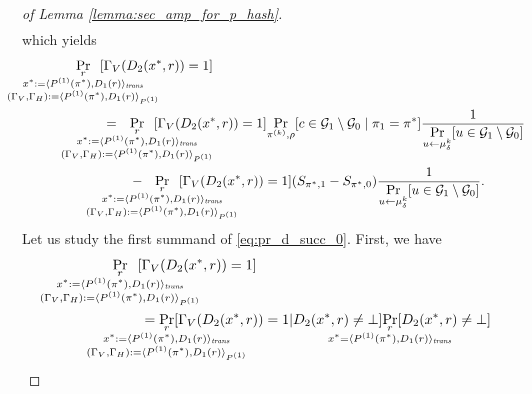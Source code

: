 \begin{proof}[of Lemma \ref{lemma:sec_amp_for_p_hash}]
\begin{align*}
\end{align*}
%
which yields
\begin{align}
\label{eq:pr_d_succ_0}
&\IndII\underset{
  \mathclap{
    \substack{r \\ x^* := \langle P^{(1)}(\pi^*), D_1(r) \rangle_{\mathit{trans}} \\ (\Gamma_V, \Gamma_H) := \langle P^{(1)}(\pi^*), D_1(r) \rangle_{P^{(1)}} }}}
{\Pr}\mkern13mu[\Gamma_V(D_2(x^*, r)) = 1] \notag\\
%
&\IndIII = \mkern13mu
  \underset{
    \mathclap{
      \substack{r \\ x^* := \langle P^{(1)}(\pi^*), D_1 (r) \rangle_{\mathit{trans}} \\ (\Gamma_V, \Gamma_H) := \langle P^{(1)}(\pi^*), D_1 (r) \rangle_{P^{(1)}} }}}
  {\Pr}\mkern13mu[\Gamma_V(D_2(x^*, r)) = 1]
  \underset{\pi^{(k)},\rho}{\Pr}[c \in \cG_1 \setminus \cG_0 \mid \pi_1 = \pi^*]
\frac{1}{\underset{u \leftarrow \mu_{\delta}^k}{\Pr}[ u \in \cG_1 \setminus \cG_0]}\notag\\
%
&\IndIIII - \mkern13mu
\underset{
  \mathclap{
  \substack{r \\ x^* := \langle P^{(1)}(\pi^*), D_1(r) \rangle_{\mathit{trans}} \\ (\Gamma_V, \Gamma_H) := \langle P^{(1)}(\pi^*), D_1(r) \rangle_{P^{(1)}} }}}
{\Pr}\mkern13mu[\Gamma_V(D_2(x^*, r)) = 1](S_{\pi^*,1} - S_{\pi^*,0})
\frac{1}{\underset{u \leftarrow \mu_{\delta}^k}{\Pr}[ u \in \cG_1 \setminus\cG_0]}.
\end{align}
Let us study the first summand of \eqref{eq:pr_d_succ_0}. First, we have
\begin{align}
  \label{eq:pr_gamma_v_0}
  \IndII &\underset{
    \mathclap{
      \substack{r \\
        x^* := \langle P^{(1)}(\pi^*), D_1 (r) \rangle_{\mathit{trans}} \\
        (\Gamma_V, \Gamma_H) := \langle P^{(1)}(\pi^*), D_1(r) \rangle_{P^{(1)}} }}}
  {\Pr}\mkern13mu[\Gamma_V(D_2(x^*, r)) = 1] \notag\\
  &\IndI = \underset{
    \mathclap{
      \substack{r \\
        x^* := \langle P^{(1)}(\pi^*), D_1 (r) \rangle_{\mathit{trans}} \\
        (\Gamma_V, \Gamma_H) := \langle P^{(1)}(\pi^*), D_1(r) \rangle_{P^{(1)}} }}}
  {\Pr}[\Gamma_V(D_2(x^*, r)) = 1 | D_2(x^*,r) \neq \bot]
  \underset{\mathclap{\substack{r \\ x^* = \langle P^{(1)}(\pi^*), D_1(r) \rangle_{\mathit{trans}}}}}{\Pr}[D_2(x^*,r) \neq \bot] \notag\\

\end{align}
\end{proof}
